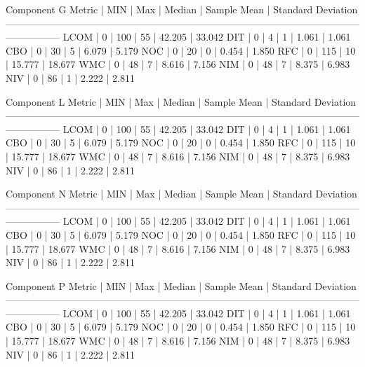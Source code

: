Component G
Metric		|		MIN 		|		Max 		| 		Median 		| 		Sample Mean 		| 		Standard Deviation
-----------------------------------------------------------------------------------------------------------------------------
LCOM		|		0			|		100			|		55			|		42.205				|		33.042
DIT 		|		0			|		4			|		1			|		1.061				|		1.061
CBO 		|		0			|		30			|		5			|		6.079				|		5.179
NOC 		|		0			|		20			|		0			|		0.454				|		1.850
RFC 		|		0			|		115			|		10 			|		15.777				|		18.677
WMC 		|		0			|		48			|		7			|		8.616				|		7.156
NIM			|		0			|		48			|		7			|		8.375				|		6.983
NIV 		|		0			|		86			|		1 			|		2.222				|		2.811






Component L
Metric		|		MIN 		|		Max 		| 		Median 		| 		Sample Mean 		| 		Standard Deviation
-----------------------------------------------------------------------------------------------------------------------------
LCOM		|		0			|		100			|		55			|		42.205				|		33.042
DIT 		|		0			|		4			|		1			|		1.061				|		1.061
CBO 		|		0			|		30			|		5			|		6.079				|		5.179
NOC 		|		0			|		20			|		0			|		0.454				|		1.850
RFC 		|		0			|		115			|		10 			|		15.777				|		18.677
WMC 		|		0			|		48			|		7			|		8.616				|		7.156
NIM			|		0			|		48			|		7			|		8.375				|		6.983
NIV 		|		0			|		86			|		1 			|		2.222				|		2.811






Component N
Metric		|		MIN 		|		Max 		| 		Median 		| 		Sample Mean 		| 		Standard Deviation
-----------------------------------------------------------------------------------------------------------------------------
LCOM		|		0			|		100			|		55			|		42.205				|		33.042
DIT 		|		0			|		4			|		1			|		1.061				|		1.061
CBO 		|		0			|		30			|		5			|		6.079				|		5.179
NOC 		|		0			|		20			|		0			|		0.454				|		1.850
RFC 		|		0			|		115			|		10 			|		15.777				|		18.677
WMC 		|		0			|		48			|		7			|		8.616				|		7.156
NIM			|		0			|		48			|		7			|		8.375				|		6.983
NIV 		|		0			|		86			|		1 			|		2.222				|		2.811






Component P
Metric		|		MIN 		|		Max 		| 		Median 		| 		Sample Mean 		| 		Standard Deviation
-----------------------------------------------------------------------------------------------------------------------------
LCOM		|		0			|		100			|		55			|		42.205				|		33.042
DIT 		|		0			|		4			|		1			|		1.061				|		1.061
CBO 		|		0			|		30			|		5			|		6.079				|		5.179
NOC 		|		0			|		20			|		0			|		0.454				|		1.850
RFC 		|		0			|		115			|		10 			|		15.777				|		18.677
WMC 		|		0			|		48			|		7			|		8.616				|		7.156
NIM			|		0			|		48			|		7			|		8.375				|		6.983
NIV 		|		0			|		86			|		1 			|		2.222				|		2.811






